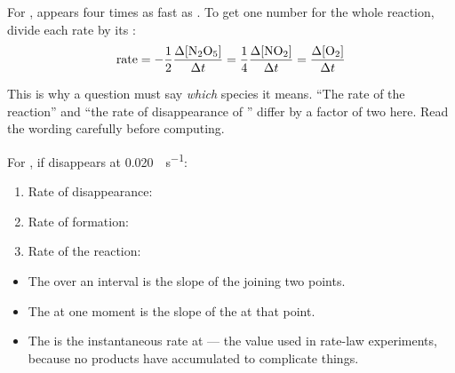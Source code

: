 \documentclass{apchem-notes}
\begin{document}

For ,  appears four times as fast as
. To get one number for the whole reaction, divide each rate by its
:
\[
  \text{rate} = -\frac{1}{2}\frac{\Delta[\ce{N2O5}]}{\Delta t}
  = \frac{1}{4}\frac{\Delta[\ce{NO2}]}{\Delta t}
  = \frac{\Delta[\ce{O2}]}{\Delta t}
\]

\begin{apcnote}
This is why a question must say \emph{which} species it means. ``The rate of
the reaction'' and ``the rate of disappearance of '' differ by a
factor of two here. Read the wording carefully before computing.
\end{apcnote}


For , if  disappears at
\SI{0.020}{\Molar\per\second}:
\begin{enumerate}[leftmargin=*,itemsep=0.3em]
  \item Rate of  disappearance:
  \item Rate of  formation:
  \item Rate of the reaction: 
\end{enumerate}



\begin{center}
\end{center}

\begin{itemize}[leftmargin=*,itemsep=0.25em]
  \item The  over an interval is the slope of the
         joining two points.
  \item The  at one moment is the slope of the
         at that point.
  \item The  is the instantaneous rate at
         --- the value used in rate-law
        experiments, because no products have accumulated to complicate
        things.
\end{itemize}
\end{document}
